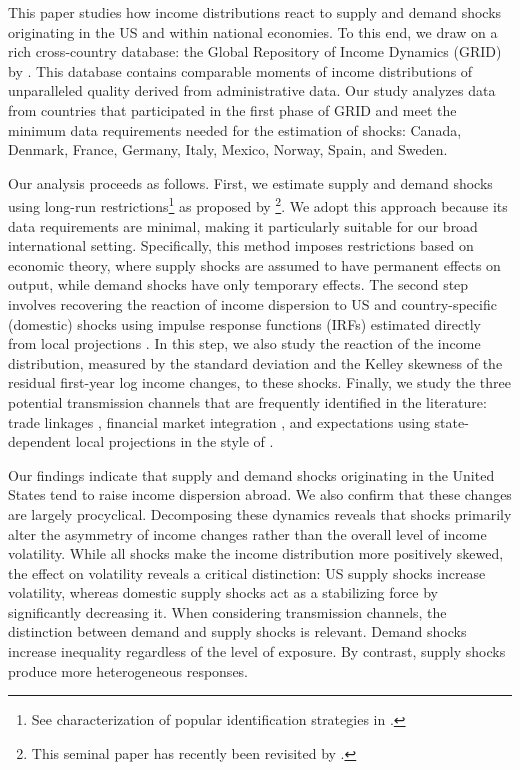 \documentclass[12pt, a4paper]{article}
\begin{document}
This paper studies how income distributions react to supply and demand shocks originating in the US and within national economies. To this end, we draw on a rich cross-country database: the Global Repository of Income Dynamics (GRID) by \textcite{guvenen2022global}. This database contains comparable moments of income distributions of unparalleled quality derived from administrative data. Our study analyzes data from countries that participated in the first phase of GRID and meet the minimum data requirements needed for the estimation of shocks: Canada, Denmark, France, Germany, Italy, Mexico, Norway, Spain, and Sweden.

Our analysis proceeds as follows. First, we estimate supply and demand shocks using long-run restrictions\footnote{See characterization of popular identification strategies in \textcite{ramey2016macroeconomic}.} as proposed by  \textcite{blanchard1989dynamic}\footnote{This seminal paper has recently been revisited by \textcite{Binet2015, Herwartz2018, Keating2013}.}. We adopt this approach because its data requirements are minimal, making it particularly suitable for our broad international setting. Specifically, this method imposes restrictions based on economic theory, where supply shocks are assumed to have permanent effects on output, while demand shocks have only temporary effects. The second step involves recovering the reaction of income dispersion to US and country-specific (domestic) shocks using impulse response functions (IRFs) estimated directly from local projections \parencite{jorda2005estimation, jorda2024local}. In this step, we also study the reaction of the income distribution, measured by the standard deviation and the Kelley skewness of the residual first-year log income changes, to these shocks. Finally, we study the three potential transmission channels that are frequently identified in the literature: trade linkages \parencite{corsetti2011multilateral}, financial market integration \parencite{faccini2016international}, and expectations \parencite{klein2021real} using state-dependent local projections in the style of \textcite{auerbach2013output}.

Our findings indicate that supply and demand shocks originating in the United States tend to raise income dispersion abroad. We also confirm that these changes are largely procyclical. Decomposing these dynamics reveals that shocks primarily alter the asymmetry of income changes rather than the overall level of income volatility. While all shocks make the income distribution more positively skewed, the effect on volatility reveals a critical distinction: US supply shocks increase volatility, whereas domestic supply shocks act as a stabilizing force by significantly decreasing it. When considering transmission channels, the distinction between demand and supply shocks is relevant. Demand shocks increase inequality regardless of the level of exposure. By contrast, supply shocks produce more heterogeneous responses.
\end{document}
